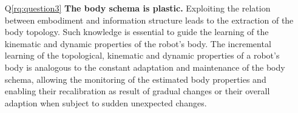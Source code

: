 \documentclass[12pt, a4paper]{article}
\begin{document}
\begin{itemize}
	
	\item[Q\ref{rq:question3}] \textbf{The body schema is plastic.} Exploiting the relation between embodiment and information structure leads to the extraction of the body topology. %
	Such knowledge is essential to guide the learning of the kinematic and dynamic properties of the robot's body. The incremental learning of the topological, kinematic and dynamic properties of a robot's body is analogous to the constant adaptation and maintenance of the body schema, allowing the monitoring of the estimated body properties and enabling their recalibration as result of gradual changes or their overall adaption when subject to sudden unexpected changes.
	

\end{itemize}





%
%
\end{document}
